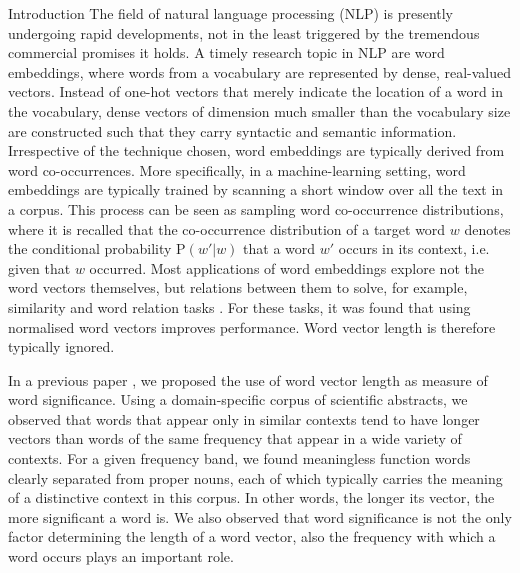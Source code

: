 \documentclass{article} %
\newcommand{\p}{\mathrm{P}}
\begin{document}
\begin{section}{Introduction}
The field of natural language processing (NLP) is presently undergoing rapid
developments, not in the least triggered by the tremendous commercial
promises it holds.  A timely research topic in NLP are word embeddings,
where words from a vocabulary are represented by dense, real-valued
vectors.  Instead of one-hot vectors that merely indicate the location
of a word in the vocabulary, dense
vectors of dimension much smaller than the vocabulary size are
constructed such that they carry syntactic and semantic information.
Irrespective of the technique chosen, word embeddings are
typically derived from word co-occurrences.  More specifically, in a
machine-learning setting, word embeddings are typically trained by
scanning a short window over all the text in a corpus.  This process can
be seen as sampling word co-occurrence distributions, where it is
recalled that the co-occurrence distribution of a target word $w$
denotes the conditional probability $\p(w'|w)$ that a word $w'$ occurs in
its context, i.e. given that $w$ occurred.  Most applications of word
embeddings explore not the word vectors themselves, but relations
between them to solve, for example, similarity and word relation tasks
\cite{vecchi-baroni-zamparelli2011}.  For these tasks, it was found that using normalised word
vectors improves performance.  Word vector length is therefore typically
ignored.

In a previous paper \cite{schakel-wilson}, we proposed the use of word
vector length as measure of word significance.  Using a domain-specific
corpus of scientific abstracts, we observed that words that appear only
in similar contexts tend to have longer vectors than words of the same
frequency that appear in a wide variety of contexts.  For a given
frequency band, we found meaningless function words clearly separated
from proper nouns, each of which typically carries the meaning of a
distinctive context in this corpus.  In other words, the longer its
vector, the more significant a word is.  We also observed that word
significance is not the only factor determining the length of a word
vector, also the frequency with which a word occurs plays an important
role.


\end{section}
\end{document}
